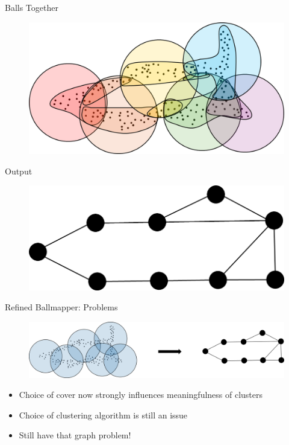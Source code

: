 \documentclass{beamer}
\begin{document}
\begin{frame}{Balls Together}
  \begin{figure}
    \begin{center}
      \includegraphics[width=1\textwidth]{intersectingballs.png}
    \end{center}
  \end{figure}
\end{frame}

\begin{frame}{Output}
\begin{figure}
  \begin{center}
    \includegraphics[width=1\textwidth]{rballmapper.png}
  \end{center}
\end{figure}
\end{frame}
  
\begin{frame}{Refined Ballmapper: Problems}
  \begin{figure}
    \begin{center}
      \includegraphics[width=1\textwidth]{rbmarrow.png}
    \end{center}
  \end{figure}
  \begin{itemize}
    \item Choice of cover now strongly influences meaningfulness of clusters
    \item Choice of clustering algorithm is still an issue
    \item Still have that graph problem!
  \end{itemize}
\end{frame}
  
\end{document}
